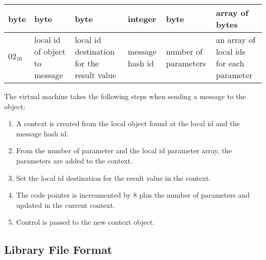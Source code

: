 \begin{center}
  \begin{tabular}{|l|p{2.7cm}|p{2.7cm}|p{2.7cm}|p{2.7cm}|p{2.7cm}|}
    \hline
    \textbf{byte} & \textbf{byte} & \textbf{byte} & \textbf{integer} &
    \textbf{byte} & \textbf{array of bytes} \\
    \hline
    $02_{16}$ & local id of object to message & local id destination for the
    result value & message hash id & number of parameters & an array of local
    ids for each parameter \\
    \hline
  \end{tabular}
\end{center}
The virtual machine takes the following steps when sending a message to the
object:
\begin{enumerate}
\item A context is created from the local object found at the local id and the
  message hash id.
\item From the number of parameter and the local id parameter array, the
  parameters are added to the context.
\item Set the local id destination for the result value in the context.
\item The code pointer is increamented by 8 plus the number of parameters and
  updated in the current context.
\item Control is passed to the new context object.
\end{enumerate}

\subsection{Library File Format}


